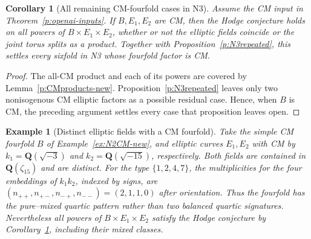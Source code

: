 \documentclass[11pt,reqno]{article}
\theoremstyle{emphasizedplain}
\newtheorem{corollary}[theorem]{Corollary}
\theoremstyle{emphasizeddefinition}
\newtheorem{example}[theorem]{Example}
\theoremstyle{emphasizeddefinition}
\newcommand{\Q}{\mathbf Q}
\begin{document}
\begin{corollary}[All remaining CM-fourfold cases in N3]\label{p:N3CM-new}
Assume the CM input in Theorem~\ref{p:openai-inputs}.
If $B,E_1,E_2$ are CM, then the Hodge conjecture holds on all
powers of $B\times E_1\times E_2$, whether or not the elliptic
fields coincide or the joint torus splits as a product.
Together with Proposition~\ref{p:N3repeated}, this settles every
sixfold in N3 whose fourfold factor is CM.
\end{corollary}
\begin{proof}
The all-CM product and each of its powers are covered by
Lemma~\ref{p:CMproducts-new}. Proposition~\ref{p:N3repeated}
leaves only two nonisogenous CM elliptic factors as a possible
residual case. Hence, when $B$ is CM, the preceding argument
settles every case that proposition leaves open.
\end{proof}
\begin{example}[Distinct elliptic fields with a CM fourfold]
Take the simple CM fourfold $B$ of Example~\ref{ex:N2CM-new},
and elliptic curves $E_1,E_2$ with CM by
$k_1=\Q(\sqrt{-3})$ and $k_2=\Q(\sqrt{-15})$, respectively.
Both fields are contained in $\Q(\zeta_{15})$ and are distinct.
For the type $\{1,2,4,7\}$, the multiplicities for the four
embeddings of $k_1k_2$, indexed by signs, are
$(n_{++},n_{+-},n_{-+},n_{--})=(2,1,1,0)$ after orientation.
Thus the fourfold has the pure--mixed quartic pattern rather than
two balanced quartic signatures. Nevertheless all powers of
$B\times E_1\times E_2$ satisfy the Hodge conjecture by
Corollary~\ref{p:N3CM-new}, including their mixed classes.
\end{example}
\end{document}
